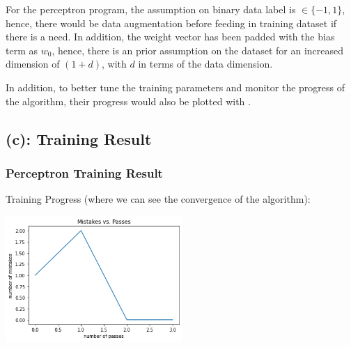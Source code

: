 \documentclass{tron}
\begin{document}
\vspace{-5pt}
\begin{alert}[Assumption]{}
	For the perceptron program, the assumption on binary data label is $\in \{-1, 1\}$, hence, there would be data augmentation before feeding in training dataset if there is a need. In addition, the weight vector has been padded with the bias term as $w_0$, hence, there is an prior assumption on the dataset for an increased dimension of $(1+d)$, with $d$ in terms of the data dimension.
\end{alert}

In addition, to better tune the training parameters and monitor the progress of the algorithm, their progress would also be plotted with .


\newpage
\subsection{(c): Training Result}
\subsubsection{Perceptron Training Result}
	Training Progress (where we can see the convergence of the algorithm):
	
	{	
			\centering
			\includegraphics[height=180px]{../src_code/fig/p1/p1_perceptron_progress}
	}	
	
\end{document}

